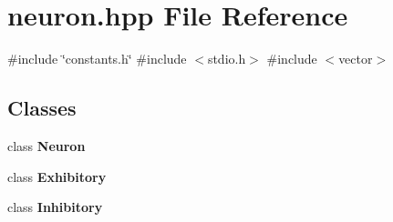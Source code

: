 \section{neuron.\+hpp File Reference}
\label{neuron_8hpp}
{\ttfamily \#include \char`\"{}constants.\+h\char`\"{}}\newline
{\ttfamily \#include $<$stdio.\+h$>$}\newline
{\ttfamily \#include $<$vector$>$}\newline
\subsection*{Classes}
\begin{DoxyCompactItemize}
\item 
class \textbf{ Neuron}
\item 
class \textbf{ Exhibitory}
\item 
class \textbf{ Inhibitory}
\end{DoxyCompactItemize}
